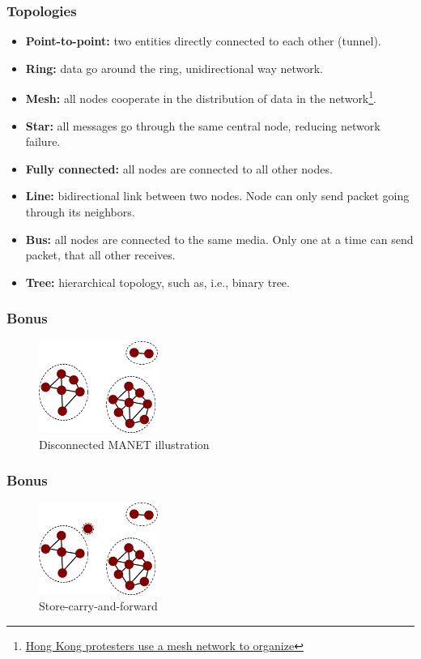   \begin{frame}
    \frametitle{Topologies}
    \begin{itemize}
      \item \textbf{Point-to-point:} two entities directly connected to each other (tunnel).\pause
      \item \textbf{Ring:} data go around the ring, unidirectional way network.\pause
      \item \textbf{Mesh:} all nodes cooperate in the distribution of data in the network\footnote{\color{blue}\href{http://www.newscientist.com/article/dn26285-hong-kong-protesters-use-a-mesh-network-to-organise.html}{Hong Kong protesters use a mesh network to organize}}.\pause
      \item \textbf{Star:} all messages go through the same central node, reducing network failure.\pause
      \item \textbf{Fully connected:} all nodes are connected to all other nodes.\pause
      \item \textbf{Line:} bidirectional link between two nodes. Node can only send packet going through its neighbors.\pause
      \item \textbf{Bus:} all nodes are connected to the same media. Only one at a time can send packet, that all other receives.\pause
      \item \textbf{Tree:} hierarchical topology, such as, i.e., binary tree.
    \end{itemize}
  \end{frame}
  \begin{frame}
    \frametitle{Bonus}
    \begin{figure}[p]
      \centering
      \includegraphics[height=3cm]{./imgs/dmanet.pdf}
      \caption{Disconnected MANET illustration \cite{ieee12khabbaz}}
      \label{fig:dmanet}
    \end{figure}
  \end{frame}
  \begin{frame}
    \frametitle{Bonus}
    \begin{figure}[p]
      \centering
      \includegraphics[height=3cm]{./imgs/store-carry-fwd-0.pdf}
      \caption{Store-carry-and-forward \cite{ieee12khabbaz}}
    \end{figure}
  \end{frame}

